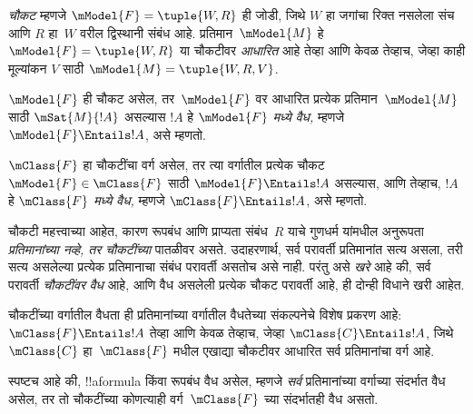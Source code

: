 \documentclass[../../../include/open-logic-section]{subfiles}
\begin{document}


\begin{defn}
  \emph{चौकट} म्हणजे $\mModel{F} = \tuple{W,R}$ ही जोडी, जिथे
  $W$ हा जगांचा रिक्त नसलेला संच आणि $R$ हा~$W$ वरील
  द्विस्थानी संबंध आहे. प्रतिमान~$\mModel{M}$ हे
  $\mModel{F} = \tuple{W,R}$ या चौकटीवर \emph{आधारित}
  आहे तेव्हा आणि केवळ तेव्हाच, जेव्हा काही मूल्यांकन
  $V$ साठी $\mModel{M} = \tuple{W, R, V}$.
\end{defn}

\begin{defn}
  $\mModel{F}$ ही चौकट असेल, तर~$\mModel{F}$ वर आधारित
  प्रत्येक प्रतिमान~$\mModel{M}$ साठी $\mSat{M}{!A}$
  असल्यास $!A$ हे \emph{$\mModel{F}$ मध्ये वैध,}
  म्हणजे $\mModel{F} \Entails !A$, असे म्हणतो.

  $\mClass{F}$ हा चौकटींचा वर्ग असेल, तर त्या वर्गातील
  प्रत्येक चौकट~$\mModel{F} \in \mClass{F}$ साठी
  $\mModel{F} \Entails !A$ असल्यास, आणि तेव्हाच,
  $!A$ हे \emph{$\mClass{F}$ मध्ये वैध,}
  म्हणजे $\mClass{F} \Entails !A$, असे म्हणतो.
\end{defn}

चौकटी महत्त्वाच्या आहेत, कारण रूपबंध आणि प्राप्यता
संबंध~$R$ याचे गुणधर्म यांमधील अनुरूपता \emph{प्रतिमानांच्या
नव्हे, तर चौकटींच्या} पातळीवर असते. उदाहरणार्थ,
 सर्व परावर्ती प्रतिमानांत सत्य असला,
तरी  सत्य असलेल्या प्रत्येक प्रतिमानाचा संबंध
परावर्ती असतोच असे नाही. परंतु असे \emph{खरे} आहे की,
 सर्व परावर्ती \emph{चौकटींवर} \emph{वैध} आहे,
आणि  वैध
असलेली प्रत्येक चौकट परावर्ती आहे, ही दोन्ही विधाने
खरी आहेत.

\begin{rem}
चौकटींच्या वर्गातील वैधता ही प्रतिमानांच्या वर्गातील
वैधतेच्या संकल्पनेचे विशेष प्रकरण आहे: $\mClass{F} \Entails !A$
तेव्हा आणि केवळ तेव्हाच, जेव्हा $\mClass{C} \Entails !A$,
जिथे $\mClass{C}$ हा~$\mClass{F}$ मधील एखाद्या
चौकटीवर आधारित सर्व प्रतिमानांचा वर्ग आहे.

स्पष्टच आहे की, !!a{formula} किंवा रूपबंध वैध असेल,
म्हणजे \emph{सर्व} प्रतिमानांच्या वर्गाच्या संदर्भात वैध
असेल, तर तो चौकटींच्या कोणत्याही वर्ग~$\mClass{F}$
च्या संदर्भातही वैध असतो.
\end{rem}
\end{document}
